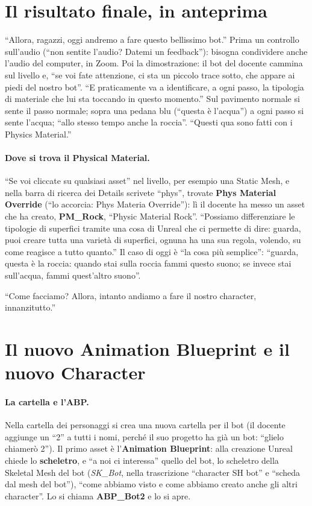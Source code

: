 \section{Il risultato finale, in anteprima}
\label{ue10:sec:demo}

``Allora, ragazzi, oggi andremo a fare questo bellissimo bot.'' Prima un controllo
sull'audio (``non sentite l'audio? Datemi un feedback''): bisogna condividere anche
l'audio del computer, in Zoom. Poi la dimostrazione: il bot del docente cammina sul
livello e, ``se voi fate attenzione, ci sta un piccolo trace sotto, che appare ai piedi
del nostro bot''. ``E praticamente va a identificare, a ogni passo, la tipologia di
materiale che lui sta toccando in questo momento.'' Sul pavimento normale si sente il
passo normale; sopra una pedana blu (``questa è l'acqua'') a ogni passo si sente l'acqua;
``allo stesso tempo anche la roccia''. ``Questi qua sono fatti con i Physics Material.''

\paragraph{Dove si trova il Physical Material.} ``Se voi cliccate su qualsiasi asset''
nel livello, per esempio una Static Mesh, e nella barra di ricerca dei Details scrivete
``phys'', trovate \textbf{Phys Material Override} (``lo accorcia: Phys Materia
Override''): lì il docente ha messo un asset che ha creato, \textbf{PM\_Rock}, ``Physic
Material Rock''. ``Possiamo differenziare le tipologie di superfici tramite una cosa di
Unreal che ci permette di dire: guarda, puoi creare tutta una varietà di superfici,
ognuna ha una sua regola, volendo, su come reagisce a tutto quanto.'' Il caso di oggi è
``la cosa più semplice'': ``guarda, questa è la roccia: quando stai sulla roccia fammi
questo suono; se invece stai sull'acqua, fammi quest'altro suono''.

``Come facciamo? Allora, intanto andiamo a fare il nostro character, innanzitutto.''

\section{Il nuovo Animation Blueprint e il nuovo Character}
\label{ue10:sec:abp}

\paragraph{La cartella e l'ABP.} Nella cartella dei personaggi si crea una nuova
cartella per il bot (il docente aggiunge un ``2'' a tutti i nomi, perché il suo progetto
ha già un bot: ``glielo chiamerò 2''). Il primo asset è l'\textbf{Animation Blueprint}:
alla creazione Unreal chiede lo \textbf{scheletro}, e ``a noi ci interessa'' quello del
bot, lo scheletro della Skeletal Mesh del bot (\emph{SK\_Bot}, nella trascrizione
``character SH bot'' e ``scheda dal mesh del bot''), ``come abbiamo visto e come abbiamo
creato anche gli altri character''. Lo si chiama \textbf{ABP\_Bot2} e lo si apre.

